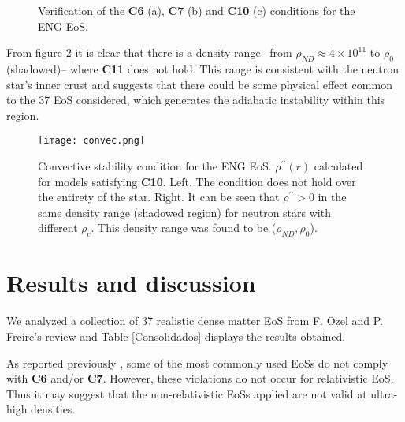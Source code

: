\documentclass[a4paper]{jpconf} %
\begin{document}
\begin{figure}\centering
{}\hfill
{}\par 
{}
\caption{Verification of the \textbf{C6} (a), \textbf{C7} (b) and \textbf{C10} (c) conditions for the ENG EoS.}
\label{fig}
\end{figure}

From figure \ref{ConvecStabilityeng}  it is clear that there is a density range  --from $\rho_{ND}\approx 4 \times 10^{11} $ to $\rho_0$ (shadowed)-- where {\bf C11} does not hold.  This range is consistent with the neutron star's inner crust and suggests that there could be some physical effect common to the 37 EoS considered, which generates the adiabatic instability within this region.

\begin{figure}%
    \centering
    \texttt{[image: convec.png]}
    \caption{Convective stability condition for the ENG EoS. $\rho^{\prime\prime}(r)$ calculated for models satisfying {\bf C10}. Left. The condition does not hold over the entirety of the star. Right. It can be seen that $\rho ^{\prime \prime}>0$ in the same density range (shadowed region) for neutron stars with different $\rho_c$. This density range was found to be ($\rho_{ND},\rho_0$). }
    \label{ConvecStabilityeng}
\end{figure}


\section{Results and discussion}\label{results}
We analyzed a collection of 37 realistic dense matter EoS from F. Özel and P. Freire's review \cite{OzelFreire2016} and Table \ref{Consolidados} displays the results obtained. 

As reported previously \cite{HaenselPotekhinYakovlev2007}, some of the most commonly used EoSs do not comply with {\bf C6} and/or {\bf C7}. However, these violations do not occur for relativistic EoS. Thus it may suggest that the non-relativistic EoSs applied are not valid at ultra-high densities.%
\end{document}
